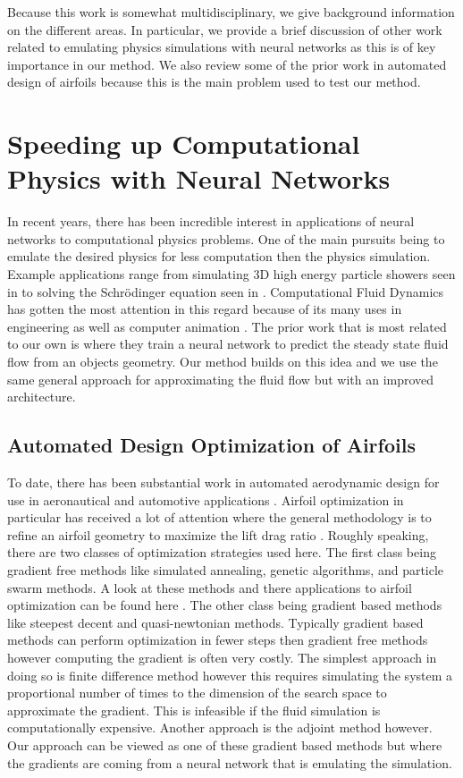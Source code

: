 \documentclass{article} %
\begin{document}
Because this work is somewhat multidisciplinary, we give background information on the different areas. In particular, we provide a brief discussion of other work related to emulating physics simulations with neural networks as this is of key importance in our method. We also review some of the prior work in automated design of airfoils because this is the main problem used to test our method.

\section{Speeding up Computational Physics with Neural Networks}

In recent years, there has been incredible interest in applications of neural networks to computational physics problems. One of the main pursuits being to emulate the desired physics for less computation then the physics simulation. Example applications range from simulating 3D high energy particle showers seen in \citep{2017arXiv170502355P} to solving the Schrödinger equation seen in \citep{mills2017deep}. Computational Fluid Dynamics has gotten the most attention in this regard because of its many uses in engineering as well as computer animation \cite{tompson2016accelerating} \cite{2017arXiv170509036H}. The prior work that is most related to our own is \citep{guo2016convolutional} where they train a neural network to predict the steady state fluid flow from an objects geometry. Our method builds on this idea and we use the same general approach for approximating the fluid flow but with an improved architecture.

\subsection{Automated Design Optimization of Airfoils}

To date, there has been substantial work in automated aerodynamic design for use in aeronautical and automotive applications \cite{ando2010automotive} \cite{demultiplexer}. Airfoil optimization in particular has received a lot of attention where the general methodology is to refine an airfoil geometry to maximize the lift drag ratio \cite{drela1998pros}. Roughly speaking, there are two classes of optimization strategies used here. The first class being gradient free methods like simulated annealing, genetic algorithms, and particle swarm methods. A look at these methods and there applications to airfoil optimization can be found here \cite{mukesh2012application}. The other class being gradient based methods like steepest decent and quasi-newtonian methods. Typically gradient based methods can perform optimization in fewer steps then gradient free methods however computing the gradient is often very costly. The simplest approach in doing so is finite difference method however this requires simulating the system a proportional number of times to the dimension of the search space to approximate the gradient. This is infeasible if the fluid simulation is computationally expensive. Another approach is the adjoint method however. Our approach can be viewed as one of these gradient based methods but where the gradients are coming from a neural network that is emulating the simulation.
\end{document}
